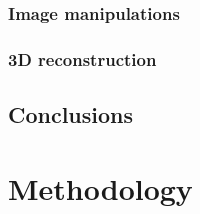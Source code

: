 \documentclass[12pt]{article}
\begin{document}
\subsubsection{Image manipulations}

\subsubsection{3D reconstruction}

\subsection{Conclusions}

\section{Methodology} 







\end{document}
